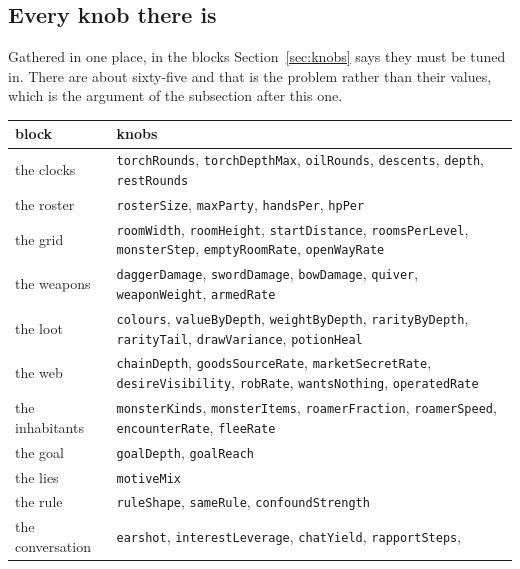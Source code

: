 \documentclass[11pt,a4paper]{article}
\begin{document}
\subsection{Every knob there is}
\label{sec:allknobs}

Gathered in one place, in the blocks Section~\ref{sec:knobs} says they must be tuned in. There are
about sixty-five and that is the problem rather than their values, which is the argument of the
subsection after this one.

\small
\begin{center}
\begin{tabular}{@{}l@{\hspace{3mm}}>{\raggedright\arraybackslash}p{}@{}}
\toprule
\textbf{block} & \textbf{knobs} \\
\midrule
the clocks &
\texttt{torchRounds}, \texttt{torchDepthMax}, \texttt{oilRounds}, \texttt{descents},
\texttt{depth}, \texttt{restRounds} \\[1mm]
the roster &
\texttt{rosterSize}, \texttt{maxParty}, \texttt{handsPer}, \texttt{hpPer} \\[1mm]
the grid &
\texttt{roomWidth}, \texttt{roomHeight}, \texttt{startDistance}, \texttt{roomsPerLevel},
\texttt{monsterStep}, \texttt{emptyRoomRate}, \texttt{openWayRate} \\[1mm]
the weapons &
\texttt{daggerDamage}, \texttt{swordDamage}, \texttt{bowDamage}, \texttt{quiver},
\texttt{weaponWeight}, \texttt{armedRate} \\[1mm]
the loot &
\texttt{colours}, \texttt{valueByDepth}, \texttt{weightByDepth}, \texttt{rarityByDepth},
\texttt{rarityTail}, \texttt{drawVariance}, \texttt{potionHeal} \\[1mm]
the web &
\texttt{chainDepth}, \texttt{goodsSourceRate}, \texttt{marketSecretRate},
\texttt{desireVisibility}, \texttt{robRate}, \texttt{wantsNothing}, \texttt{operatedRate} \\[1mm]
the inhabitants &
\texttt{monsterKinds}, \texttt{monsterItems}, \texttt{roamerFraction}, \texttt{roamerSpeed},
\texttt{encounterRate}, \texttt{fleeRate} \\[1mm]
the goal &
\texttt{goalDepth}, \texttt{goalReach} \\[1mm]
the lies &
\texttt{motiveMix} \\[1mm]
the rule &
\texttt{ruleShape}, \texttt{sameRule}, \texttt{confoundStrength} \\[1mm]
the conversation &
\texttt{earshot}, \texttt{interestLeverage}, \texttt{chatYield}, \texttt{rapportSteps},

\end{tabular}
\end{center}
\end{document}
